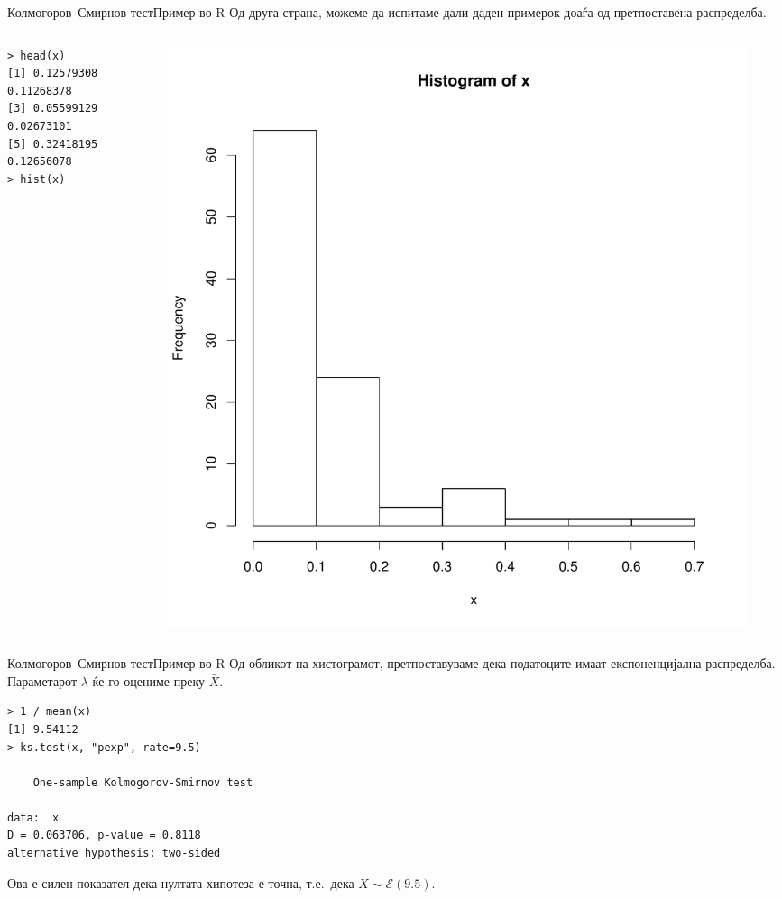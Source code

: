 \documentclass[hyperref={unicode}, xcolor={svgnames, table},
usepdftitle=false]{beamer}
\theoremstyle{remark}
\begin{document}
\begin{frame}[fragile]{Колмогоров--Смирнов тест}{Пример во R}
  Од друга страна, можеме да испитаме дали даден примерок доаѓа од претпоставена
  распределба.
  \begin{columns}
    \begin{column}{.4\textwidth}
\begin{verbatim}
> head(x)
[1] 0.12579308 0.11268378
[3] 0.05599129 0.02673101
[5] 0.32418195 0.12656078
> hist(x)
\end{verbatim}
    \end{column}
    \begin{column}{.6\textwidth}
      \begin{figure}
        \centering
        \includegraphics[width=.8\textwidth]{Histogram_Sample.pdf}
      \end{figure}
    \end{column}
  \end{columns}
\end{frame}

\begin{frame}[fragile]{Колмогоров--Смирнов тест}{Пример во R}
  Од обликот на хистограмот, претпоставуваме дека податоците имаат
  експоненцијална распределба.  Параметарот \(\lambda\) ќе го оцениме преку
  \(\bar{X}\).
\begin{verbatim}
> 1 / mean(x)
[1] 9.54112
> ks.test(x, "pexp", rate=9.5)

	One-sample Kolmogorov-Smirnov test

data:  x
D = 0.063706, p-value = 0.8118
alternative hypothesis: two-sided
\end{verbatim}
  Ова е силен показател дека нултата хипотеза е точна, т.е.\ дека
  \(X \sim \mathcal{E}(\num{9.5})\).
\end{frame}
\end{document}

